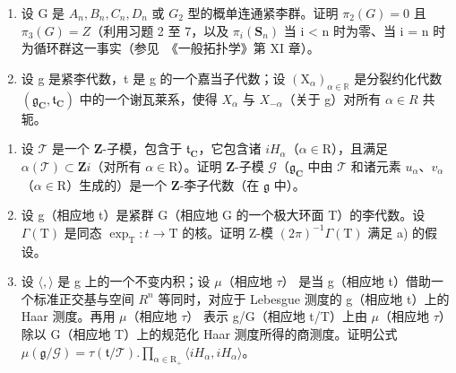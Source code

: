 \begin{enumerate}
\def\labelenumi{\arabic{enumi})}
\setcounter{enumi}{7}
\item
  设 G 是 \(A_{n}, B_{n}, C_{n}, D_{n}\) 或 \(G_{2}\) 型的概单连通紧李群。证明 \(\pi_{2}(G) = 0\) 且 \(\pi_{3}(G) = Z\)（利用习题 2 至 7，以及 \(\pi_{i}(\mathbf{S}_{n})\) 当 i \textless{} n 时为零、当 i = n 时为循环群这一事实（参见~《一般拓扑学》第 XI 章）。
\item
  设 g 是紧李代数，t 是 g 的一个嘉当子代数；设 \((\mathrm{X}_{\alpha})_{\alpha\in\mathbb{R}}\) 是分裂约化代数 \((\mathfrak{g}_{\mathbf{C}},\mathfrak{t}_{\mathbf{C}})\) 中的一个谢瓦莱系，使得 \(X_{\alpha}\) 与 \(X_{-\alpha}\)（关于 g）对所有 \(\alpha\in R\) 共轭。
\end{enumerate}

\begin{enumerate}
\def\labelenumi{\alph{enumi})}
\item
  设 \(\mathcal{T}\) 是一个 \(\mathbf{Z}\)-子模，包含于 \(\mathfrak{t}_{\mathbf{C}}\)，它包含诸 \(iH_{\alpha}\)（\(\alpha \in \mathrm{R}\)），且满足 \(\alpha(\mathcal{T}) \subset \mathbf{Z}i\)（对所有 \(\alpha \in \mathrm{R}\)）。证明 \(\mathbf{Z}\)-子模 \(\mathcal{G}\)（\(\mathfrak{g}_{\mathbf{C}}\) 中由 \(\mathcal{T}\) 和诸元素 \(u_{\alpha}\)、\(v_{\alpha}\)（\(\alpha \in \mathrm{R}\)）生成的）是一个 \(\mathbf{Z}\)-李子代数（在 \(\mathfrak{g}\) 中）。
\item
  设 g（相应地 t）是紧群 G（相应地 G 的一个极大环面 T）的李代数。设 \(\Gamma(\mathrm{T})\) 是同态 \(\exp_{\mathrm{T}}:t\to\mathrm{T}\) 的核。证明 Z-模 \((2\pi)^{-1}\varGamma(\mathrm{T})\) 满足 a) 的假设。
\item
  设 \(\langle,\rangle\) 是 g 上的一个不变内积；设 \(\mu\)（相应地 \(\tau\)） 是当 g（相应地 t）借助一个标准正交基与空间 \(R^{n}\) 等同时，对应于 Lebesgue 测度的 g（相应地 t）上的 Haar 测度。再用 \(\mu\)（相应地 \(\tau\)） 表示 g/G（相应地 t/T）上由 \(\mu\)（相应地 \(\tau\)） 除以 G（相应地 T）上的规范化 Haar 测度所得的商测度。证明公式 \(\mu(\mathfrak{g}/\mathcal{G})=\tau(\mathfrak{t}/\mathcal{T}).\prod_{\alpha\in\mathrm{R}_{+}}\langle iH_{\alpha},iH_{\alpha}\rangle\)。
\end{enumerate}

